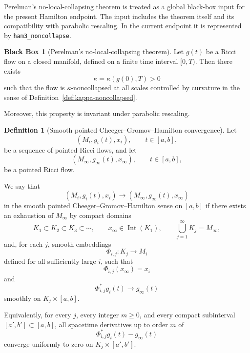 \documentclass[11pt]{article}
\theoremstyle{plain}
\theoremstyle{definition}
\newtheorem{definition}[theorem]{Definition}
\newtheorem{blackbox}[theorem]{Black Box}
\theoremstyle{remark}
\newcommand{\leanref}[1]{\nolinkurl{#1}}
\begin{document}
Perelman's no-local-collapsing theorem is treated as a global black-box input
for the present Hamilton endpoint.  The input includes the theorem itself and
its compatibility with parabolic rescaling.  In the current endpoint it is
represented by \leanref{ham3_noncollapse}.

\begin{blackbox}[Perelman's no-local-collapsing theorem]
\label{bb:no-local-collapsing}
Let $g(t)$ be a Ricci flow on a closed manifold, defined on a finite time
interval $[0,T)$. Then there exists
\[
\kappa=\kappa(g(0),T)>0
\]
such that the flow is $\kappa$-noncollapsed at all scales controlled by
curvature in the sense of Definition~\ref{def:kappa-noncollapsed}.

Moreover, this property is invariant under parabolic rescaling.
\end{blackbox}

\begin{definition}[Smooth pointed Cheeger--Gromov--Hamilton convergence]
\label{def:cgh-convergence}
Let
\[
(M_i,g_i(t),x_i),
\qquad
 t\in [a,b],
\]
be a sequence of pointed Ricci flows, and let
\[
(M_\infty,g_\infty(t),x_\infty),
\qquad
 t\in [a,b],
\]
be a pointed Ricci flow.

We say that
\[
(M_i,g_i(t),x_i)
\longrightarrow
(M_\infty,g_\infty(t),x_\infty)
\]
in the smooth pointed Cheeger--Gromov--Hamilton sense on $[a,b]$ if there
exists an exhaustion of $M_\infty$ by compact domains
\[
K_1\subset K_2\subset K_3\subset\cdots,
\qquad
x_\infty\in \operatorname{Int}(K_1),
\qquad
\bigcup_{j=1}^\infty K_j=M_\infty,
\]
and, for each $j$, smooth embeddings
\[
\Phi_{i,j}:K_j\to M_i
\]
defined for all sufficiently large $i$, such that
\[
\Phi_{i,j}(x_\infty)=x_i
\]
and
\[
\Phi_{i,j}^*g_i(t)\longrightarrow g_\infty(t)
\]
smoothly on $K_j\times [a,b]$.

Equivalently, for every $j$, every integer $m\ge 0$, and every compact
subinterval $[a',b']\subset [a,b]$, all spacetime derivatives up to order $m$
of
\[
\Phi_{i,j}^*g_i(t)-g_\infty(t)
\]
converge uniformly to zero on $K_j\times [a',b']$.
\end{definition}
\end{document}
